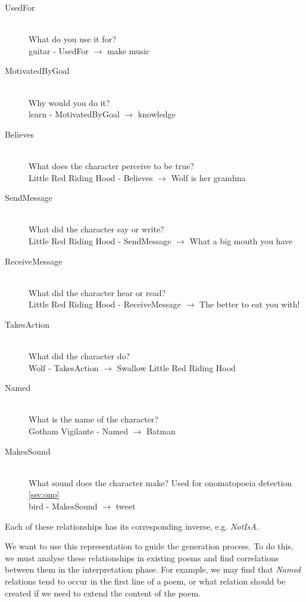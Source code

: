 \begin{description}
\item[UsedFor] \hfill \\ What do you use it for? \hfill \\ guitar - UsedFor $\rightarrow$ make music
\item[MotivatedByGoal] \hfill \\ Why would you do it? \hfill \\ learn - MotivatedByGoal $\rightarrow$ knowledge
\item[Believes] \hfill \\ What does the character perceive to be true? \hfill \\ Little Red Riding Hood - Believes $\rightarrow$ Wolf is her grandma
\item[SendMessage] \hfill \\ What did the character say or write?  \hfill \\ Little Red Riding Hood - SendMessage $\rightarrow$ What a big mouth you have
\item[ReceiveMessage] \hfill \\ What did the character hear or read?  \hfill \\ Little Red Riding Hood - ReceiveMessage $\rightarrow$ The better to eat you with!
\item[TakesAction] \hfill \\ What did the character do?  \hfill \\ Wolf - TakesAction $\rightarrow$ Swallow Little Red Riding Hood
\item[Named] \hfill \\ What is the name of the character? \hfill \\ Gotham Vigilante - Named $\rightarrow$ Batman
\item[MakesSound] \hfill \\ What sound does the character make? Used for onomatopoeia detection \ref{sec:ono} \hfill \\ bird - MakesSound $\rightarrow$ tweet
\end{description}

Each of these relationships has its corresponding inverse, e.g. \textit{NotIsA}. 

We want to use this representation to guide the generation process. To do this, we must analyse these relationships in existing poems and find correlations between them in the interpretation phase. For example, we may find that \textit{Named} relations tend to occur in the first line of a poem, or what relation should be created if we need to extend the content of the poem.  

